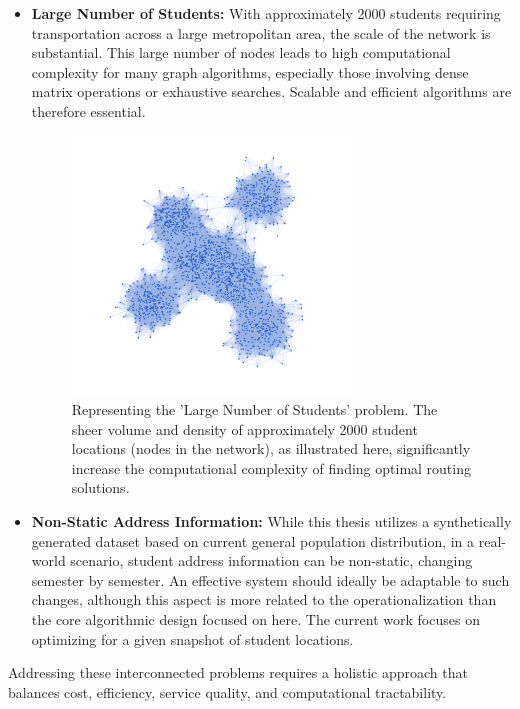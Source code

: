 \begin{itemize}
    \item \textbf{Large Number of Students:} With approximately 2000 students requiring transportation across a large metropolitan area, the scale of the network is substantial. This large number of nodes leads to high computational complexity for many graph algorithms, especially those involving dense matrix operations or exhaustive searches. Scalable and efficient algorithms are therefore essential.
    \begin{figure}[!htbp]
        \centering
        \includegraphics[width=0.7\textwidth]{img/large_scale_students.png}
        \caption{Representing the 'Large Number of Students' problem. The sheer volume and density of approximately 2000 student locations (nodes in the network), as illustrated here, significantly increase the computational complexity of finding optimal routing solutions.}
        \label{fig:problem_large_scale}
    \end{figure}

    \item \textbf{Non-Static Address Information:} While this thesis utilizes a synthetically generated dataset based on current general population distribution, in a real-world scenario, student address information can be non-static, changing semester by semester. An effective system should ideally be adaptable to such changes, although this aspect is more related to the operationalization than the core algorithmic design focused on here. The current work focuses on optimizing for a given snapshot of student locations.
\end{itemize}
Addressing these interconnected problems requires a holistic approach that balances cost, efficiency, service quality, and computational tractability.

